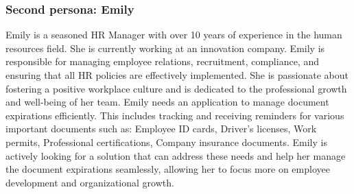 \subsubsection{Second persona: Emily}

\begin{minipage}[t]{0.65\textwidth} %
	\vspace{0pt} %
Emily is a seasoned HR Manager with over 10 years of experience in the human resources field. She is currently working at an innovation company. Emily is responsible for managing employee relations, recruitment, compliance, and ensuring that all HR policies are effectively implemented. She is passionate about fostering a positive workplace culture and is dedicated to the professional growth and well-being of her team.
Emily needs an application to manage document expirations efficiently. This includes tracking and receiving reminders for various important documents such as: Employee ID cards, Driver's licenses, Work permits, Professional certifications, Company insurance documents.
Emily is actively looking for a solution that can address these needs and help her manage the document expirations seamlessly, allowing her to focus more on employee development and organizational growth.
\end{minipage}
\hfill
